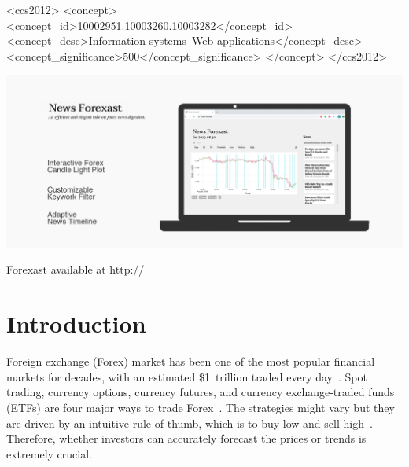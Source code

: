 \documentclass[sigconf]{acmart}
\begin{document}
\begin{CCSXML}
<ccs2012>
   <concept>
       <concept_id>10002951.10003260.10003282</concept_id>
       <concept_desc>Information systems~Web applications</concept_desc>
       <concept_significance>500</concept_significance>
       </concept>
 </ccs2012>
\end{CCSXML}




\begin{teaserfigure}
  \includegraphics[width=\textwidth]{teaser.png}
  \caption{Forexast available at http://}
  \Description{}
  \label{fig:teaser}
\end{teaserfigure}


\maketitle

\section{Introduction}
Foreign exchange (Forex) market has been one of the most popular financial markets for decades, with an estimated \$1\ trillion traded every day~\cite{YAO200079}.
Spot trading, currency options, currency futures, and currency exchange-traded funds (ETFs) are four major ways to trade Forex~\cite{TradeForex}.
The strategies might vary but they are driven by an intuitive rule of thumb, which is to buy low and sell high~\cite{KOOLEN2014144,Zervos11}.
Therefore, whether investors can accurately forecast the prices or trends is extremely crucial. 
\end{document}
